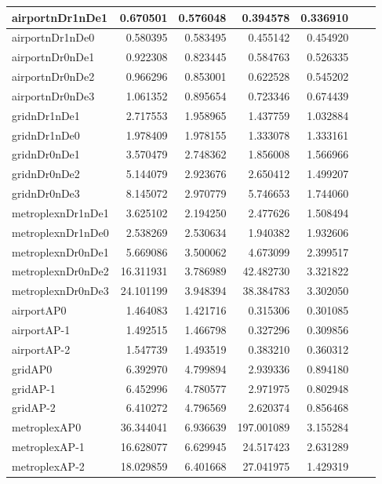 \documentclass[../../../thesis.tex]{subfiles}
\begin{document}
\begin{longtable}{|l|r|r|r|r|r|r|}
\endlastfoot
airportnDr1nDe1 & 0.670501 & 0.576048 & 0.394578 & 0.336910 \\ \hline
airportnDr1nDe0 & 0.580395 & 0.583495 & 0.455142 & 0.454920 \\ \hline
airportnDr0nDe1 & 0.922308 & 0.823445 & 0.584763 & 0.526335 \\ \hline
airportnDr0nDe2 & 0.966296 & 0.853001 & 0.622528 & 0.545202 \\ \hline
airportnDr0nDe3 & 1.061352 & 0.895654 & 0.723346 & 0.674439 \\ \hline
gridnDr1nDe1 & 2.717553 & 1.958965 & 1.437759 & 1.032884 \\ \hline
gridnDr1nDe0 & 1.978409 & 1.978155 & 1.333078 & 1.333161 \\ \hline
gridnDr0nDe1 & 3.570479 & 2.748362 & 1.856008 & 1.566966 \\ \hline
gridnDr0nDe2 & 5.144079 & 2.923676 & 2.650412 & 1.499207 \\ \hline
gridnDr0nDe3 & 8.145072 & 2.970779 & 5.746653 & 1.744060 \\ \hline
metroplexnDr1nDe1 & 3.625102 & 2.194250 & 2.477626 & 1.508494 \\ \hline
metroplexnDr1nDe0 & 2.538269 & 2.530634 & 1.940382 & 1.932606 \\ \hline
metroplexnDr0nDe1 & 5.669086 & 3.500062 & 4.673099 & 2.399517 \\ \hline
metroplexnDr0nDe2 & 16.311931 & 3.786989 & 42.482730 & 3.321822 \\ \hline
metroplexnDr0nDe3 & 24.101199 & 3.948394 & 38.384783 & 3.302050 \\ \hline
airportAP0 & 1.464083 & 1.421716 & 0.315306 & 0.301085 \\ \hline
airportAP-1 & 1.492515 & 1.466798 & 0.327296 & 0.309856 \\ \hline
airportAP-2 & 1.547739 & 1.493519 & 0.383210 & 0.360312 \\ \hline
gridAP0 & 6.392970 & 4.799894 & 2.939336 & 0.894180 \\ \hline
gridAP-1 & 6.452996 & 4.780577 & 2.971975 & 0.802948 \\ \hline
gridAP-2 & 6.410272 & 4.796569 & 2.620374 & 0.856468 \\ \hline
metroplexAP0 & 36.344041 & 6.936639 & 197.001089 & 3.155284 \\ \hline
metroplexAP-1 & 16.628077 & 6.629945 & 24.517423 & 2.631289 \\ \hline
metroplexAP-2 & 18.029859 & 6.401668 & 27.041975 & 1.429319 \\ \hline

\end{longtable}
\end{document}
